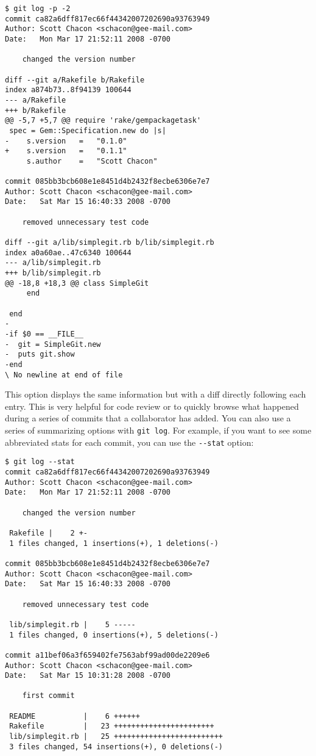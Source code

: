\documentclass[a4paper]{book}
\begin{document}
\begin{shaded}\begin{verbatim}
$ git log -p -2
commit ca82a6dff817ec66f44342007202690a93763949
Author: Scott Chacon <schacon@gee-mail.com>
Date:   Mon Mar 17 21:52:11 2008 -0700

    changed the version number

diff --git a/Rakefile b/Rakefile
index a874b73..8f94139 100644
--- a/Rakefile
+++ b/Rakefile
@@ -5,7 +5,7 @@ require 'rake/gempackagetask'
 spec = Gem::Specification.new do |s|
-    s.version   =   "0.1.0"
+    s.version   =   "0.1.1"
     s.author    =   "Scott Chacon"

commit 085bb3bcb608e1e8451d4b2432f8ecbe6306e7e7
Author: Scott Chacon <schacon@gee-mail.com>
Date:   Sat Mar 15 16:40:33 2008 -0700

    removed unnecessary test code

diff --git a/lib/simplegit.rb b/lib/simplegit.rb
index a0a60ae..47c6340 100644
--- a/lib/simplegit.rb
+++ b/lib/simplegit.rb
@@ -18,8 +18,3 @@ class SimpleGit
     end

 end
-
-if $0 == __FILE__
-  git = SimpleGit.new
-  puts git.show
-end
\ No newline at end of file
\end{verbatim}\end{shaded}

This option displays the same information but with a diff directly following each entry. This is very helpful for code review or to quickly browse what happened during a series of commits that a collaborator has added. You can also use a series of summarizing options with \texttt{git log}. For example, if you want to see some abbreviated stats for each commit, you can use the \texttt{-{}-stat} option:

\begin{shaded}\begin{verbatim}
$ git log --stat
commit ca82a6dff817ec66f44342007202690a93763949
Author: Scott Chacon <schacon@gee-mail.com>
Date:   Mon Mar 17 21:52:11 2008 -0700

    changed the version number

 Rakefile |    2 +-
 1 files changed, 1 insertions(+), 1 deletions(-)

commit 085bb3bcb608e1e8451d4b2432f8ecbe6306e7e7
Author: Scott Chacon <schacon@gee-mail.com>
Date:   Sat Mar 15 16:40:33 2008 -0700

    removed unnecessary test code

 lib/simplegit.rb |    5 -----
 1 files changed, 0 insertions(+), 5 deletions(-)

commit a11bef06a3f659402fe7563abf99ad00de2209e6
Author: Scott Chacon <schacon@gee-mail.com>
Date:   Sat Mar 15 10:31:28 2008 -0700

    first commit

 README           |    6 ++++++
 Rakefile         |   23 +++++++++++++++++++++++
 lib/simplegit.rb |   25 +++++++++++++++++++++++++
 3 files changed, 54 insertions(+), 0 deletions(-)
\end{verbatim}\end{shaded}
\end{document}
